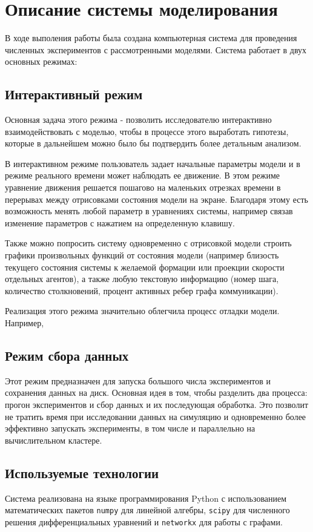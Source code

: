 \chapter{Описание системы моделирования} \label{simulation}

В ходе выполения работы была создана компьютерная система для проведения численных экспериментов с рассмотренными моделями. 
Система работает в двух основных режимах:

\section{Интерактивный режим}
Основная задача этого режима - позволить исследователю интерактивно взаимодействовать с моделью, чтобы в процессе этого выработать гипотезы, которые в дальнейшем можно было бы подтвердить более детальным анализом.

В интерактивном режиме пользователь задает начальные параметры модели и в режиме реального времени может наблюдать  ее движение. В этом режиме уравнение движения решается пошагово на маленьких отрезках времени в перерывах между отрисовками состояния модели на экране. 
Благодаря этому есть возможность менять любой параметр в уравнениях системы, например связав изменение параметров с нажатием на определенную клавишу. 

Также можно попросить систему одновременно с отрисовкой модели строить графики произвольных функций от состояния модели (например близость текущего состояния системы к желаемой формации или проекции скорости отдельных агентов), а также любую текстовую информацию (номер шага, количество столкновений, процент активных ребер графа коммуникации).

Реализация этого режима значительно облегчила процесс отладки модели. Например, 

\section{Режим сбора данных}
Этот режим предназначен для запуска большого числа экспериментов и сохранения данных на диск. Основная идея в том, чтобы
разделить два процесса: прогон экспериментов и сбор данных и их последующая обработка. Это позволит не тратить время при исследовании данных на симуляцию и одновременно более эффективно запускать эксперименты, в том числе и параллельно на вычислительном кластере.

\section{Используемые технологии}
Система реализована на языке программирования Python с использованием математических пакетов \texttt{numpy} для линейной алгебры, \texttt{scipy} для численного решения дифференциальных уравнений и \texttt{networkx} для работы с графами. 

